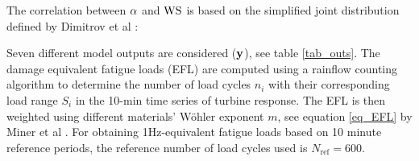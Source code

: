 \documentclass[preprint,12pt]{elsarticle}
\begin{document}
\noindent %
%


The correlation between $\alpha$ and $\text{WS}$ is based on the simplified joint distribution defined by Dimitrov et al \cite{dimitrov2015model}:



Seven different model outputs are considered ($\mathbf{y}$), see table \ref{tab_outs}. The damage equivalent fatigue loads (EFL) are computed using a rainflow counting algorithm to determine the number of load cycles $n_i$  with their corresponding load range $S_i$  in the 10-min time series of turbine response. The EFL is then weighted using different materials' W{\"o}hler exponent $m$, see equation \ref{eq_EFL} by Miner et al \cite{miner1945cumulative}. For obtaining 1Hz-equivalent fatigue loads based on 10 minute reference periods, the reference number of load cycles used is $N_{\text{ref}}=600$.


\begin{table}[!h]
\begin{centering}
\caption{Wind turbine model outputs.}
\label{tab_outs}
\end{centering}
\end{table}
\end{document}
